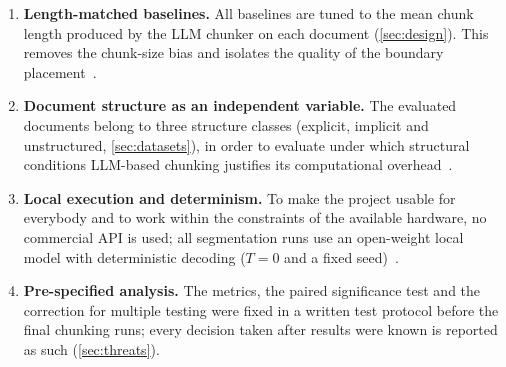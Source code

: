 \begin{enumerate}
    \item \textbf{Length-matched baselines.} All baselines are tuned to the mean chunk
    length produced by the LLM chunker on each document (\cref{sec:design}). This removes
    the chunk-size bias and isolates the quality of the boundary
    placement~\cite{qu-etal-2025-semantic}.

    \item \textbf{Document structure as an independent variable.} The evaluated documents
    belong to three structure classes (explicit, implicit and unstructured,
    \cref{sec:datasets}), in order to evaluate under which structural conditions LLM-based
    chunking justifies its computational overhead~\cite{qu-etal-2025-semantic,
    smigielski2026chunking}.

    \item \textbf{Local execution and determinism.} To make the project usable for
    everybody and to work within the constraints of the available hardware, no commercial
    API is used; all segmentation runs use an open-weight local model with deterministic
    decoding ($T = 0$ and a fixed seed)~\cite{smigielski2026chunking}.

    \item \textbf{Pre-specified analysis.} The metrics, the paired significance test and
    the correction for multiple testing were fixed in a written test protocol before the
    final chunking runs; every decision taken after results were known is reported as such
    (\cref{sec:threats}).
\end{enumerate}

